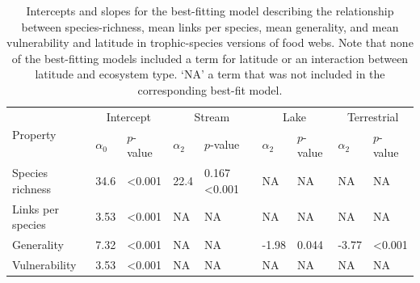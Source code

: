 \documentclass[12pt]{article}
\begin{document}
\begin{table}[!h]
\caption{Intercepts and slopes for the best-fitting model describing the relationship between species-richness, mean links per species, mean generality, and mean vulnerability and latitude in trophic-species versions of food webs. Note that none
of the best-fitting models included a term for latitude or an interaction between latitude and ecosystem type. `NA' a term that was not included in the corresponding best-fit model.}
\label{Latlms}
\begin{tabular}{l | l l  l l  l l  l l}

\hline
\multirow{2}{*}{Property} & \multicolumn{2}{|c}{Intercept} & \multicolumn{2}{|c}{Stream} & \multicolumn{2}{|c}{Lake} & \multicolumn{2}{|c}{Terrestrial}\\
& $\alpha_{0}$ & $p$-value & $\alpha_{2}$ & $p$-value & $\alpha_{2}$ & $p$-value & $\alpha_{2}$ &$p$-value\\
\hline
Species richness  & 34.6 & \textless0.001 & 22.4 & 0.167 \textless0.001 & NA & NA & NA & NA \\
Links per species & 3.53 & \textless0.001 & NA & NA & NA & NA & NA & NA \\
Generality        & 7.32 & \textless0.001 & NA & NA & -1.98 & 0.044 & -3.77 & \textless0.001 \\
Vulnerability     & 3.53 & \textless0.001 & NA & NA & NA & NA & NA & NA \\
\hline
\end{tabular}
\end{table}
\end{document}

